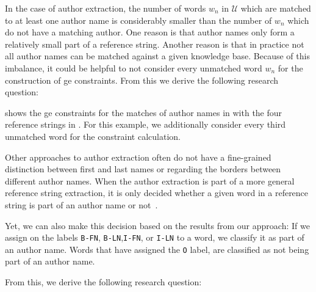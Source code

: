 \bigskip

In the case of author extraction, the number of words $w_n$ in $\mathcal{U}$ which are matched to at least one author name is considerably smaller than the number of $w_n$ which do not have a matching author.
One reason is that author names only form a relatively small part of a reference string.
Another reason is that in practice not all author names can be matched against a given knowledge base.
Because of this imbalance, it could be helpful to not consider every unmatched word $w_n$ for the construction of \gls{ge} constraints.
From this we derive the following research question:
\newcommand\researchquestionfour{}
\researchquestionfour%

 shows the \gls{ge} constraints for the matches of author names in  with the four reference strings in .
For this example, we additionally consider every third unmatched word for the constraint calculation.

\bigskip

Other approaches to author extraction often do not have a fine-grained distinction between first and last names or regarding the borders between different author names.
When the author extraction is part of a more general reference string extraction, it is only decided whether a given word in a reference string is part of an author name or not~\citep[e.g.][]{chen1999gaussian,councill2008parscit,wu2014citeseerx,bellare2007learning}.

Yet, we can also make this decision based on the results from our approach:
If we assign on the labels \texttt{B-FN}, \texttt{B-LN},\texttt{I-FN}, or \texttt{I-LN} to a word, we classify it as part of an author name.
Words that have assigned the \texttt{O} label, are classified as not being part of an author name.

From this, we derive the following research question:
\newcommand\researchquestionfive{}
\researchquestionfive%


